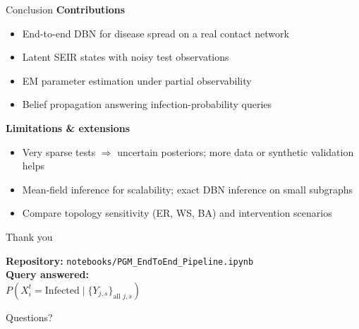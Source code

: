 \documentclass[aspectratio=169,11pt]{beamer}
\begin{document}
\begin{frame}{Conclusion}
  \textbf{Contributions}
  \begin{itemize}
    \item End-to-end DBN for disease spread on a real contact network
    \item Latent SEIR states with noisy test observations
    \item EM parameter estimation under partial observability
    \item Belief propagation answering infection-probability queries
  \end{itemize}
  \vspace{0.4em}
  \textbf{Limitations \& extensions}
  \begin{itemize}
    \item Very sparse tests $\Rightarrow$ uncertain posteriors; more data or synthetic validation helps
    \item Mean-field inference for scalability; exact DBN inference on small subgraphs
    \item Compare topology sensitivity (ER, WS, BA) and intervention scenarios
  \end{itemize}
\end{frame}

\begin{frame}
  \centering
  \Large Thank you
  \vspace{1em}

  \normalsize
  \textbf{Repository:} \texttt{notebooks/PGM\_EndToEnd\_Pipeline.ipynb}\\[0.4em]
  \textbf{Query answered:}\\
  $P(X_i^t = \text{Infected} \mid \{Y_{j,s}\}_{\text{all } j,s})$
  \vspace{1em}

  \small Questions?
\end{frame}
\end{document}
